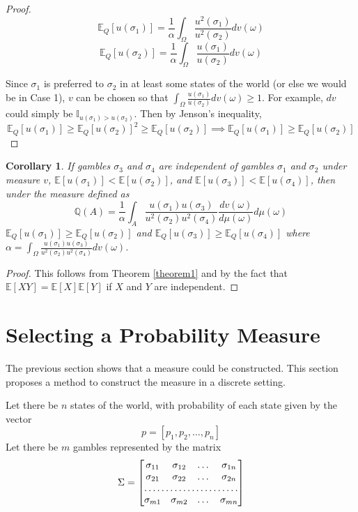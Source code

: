 \documentclass{article}
\newtheorem{corollary}{Corollary}
\begin{document}
\begin{proof}
\[\mathbb{E}_Q[u(\sigma_1)]=\frac{1}{\alpha} \int_\Omega \frac{u^2(\sigma_1)}{u^2(\sigma_2)} dv(\omega)\]
\[\mathbb{E}_Q[u(\sigma_2)]=\frac{1}{\alpha} \int_\Omega \frac{u(\sigma_1)}{u(\sigma_2)} dv(\omega)\]

Since \(\sigma_1\) is preferred to \(\sigma_2\) in at least some states of the world (or else we would be in Case 1), \(v\) can be chosen so that \(\int_\Omega \frac{u(\sigma_1)}{u(\sigma_2)} dv(\omega)\geq 1\).  For example, \(dv\) could simply be \(\mathbb{I}_{u(\sigma_1)>u(\sigma_2)}\).  Then by Jenson's inequality, 
\[\mathbb{E}_Q[u(\sigma_1)] \geq   \mathbb{E}_Q[u(\sigma_2)]^2 \geq  \mathbb{E}_Q[u(\sigma_2)] \implies \mathbb{E}_Q[u(\sigma_1)] \geq \mathbb{E}_Q[u(\sigma_2)] \]

\end{proof}

\begin{corollary}\label{corr1}
	If gambles \(\sigma_3\) and \(\sigma_4\) are independent of gambles \(\sigma_1\) and \(\sigma_2\) under measure \(v\), \(\mathbb{E}[u(\sigma_1)] < \mathbb{E}[u(\sigma_2)]\), and \(\mathbb{E}[u(\sigma_3)] < \mathbb{E}[u(\sigma_4)]\), then under the measure defined as 
	\[\mathbb{Q}(A)=\frac{1}{\alpha}\int_A \frac{u(\sigma_1)u(\sigma_3)}{u^2(\sigma_2)u^2(\sigma_4)} \frac{dv(\omega) }{ d\mu(\omega)} d\mu(\omega)\]
	\(\mathbb{E}_Q[u(\sigma_1)]\geq\mathbb{E}_Q[u(\sigma_2)]\) and \(\mathbb{E}_Q[u(\sigma_3)]\geq\mathbb{E}_Q[u(\sigma_4)]\) where \(\alpha=\int_\Omega \frac{u(\sigma_1)u(\sigma_3)}{u^2(\sigma_2)u^2(\sigma_4)} dv(\omega) \).
\end{corollary}

\begin{proof}
This follows from Theorem \ref{theorem1} and by the fact that \(\mathbb{E}[XY]=\mathbb{E}[X]\mathbb{E}[Y]\) if \(X\) and \(Y\) are independent.  
\end{proof}

\section{Selecting a Probability Measure}

The previous section shows that a measure could be constructed.  This section proposes a method to construct the measure in a discrete setting.

Let there be \(n\) states of the world, with probability of each state given by the vector 
\[p = [p_1, p_2, \dotsc, p_n]\]  
Let there be \(m\) gambles represented by the matrix 
\[\Sigma = \begin{bmatrix}
    \sigma_{11}       & \sigma_{12} & \dots & \sigma_{1n} \\
    \sigma_{21}       & \sigma_{22}  & \dots & \sigma_{2n} \\
    \hdotsfor{4} \\
    \sigma_{m1}       & \sigma_{m2} & \dots & \sigma_{mn}
\end{bmatrix}\]
\end{document}
